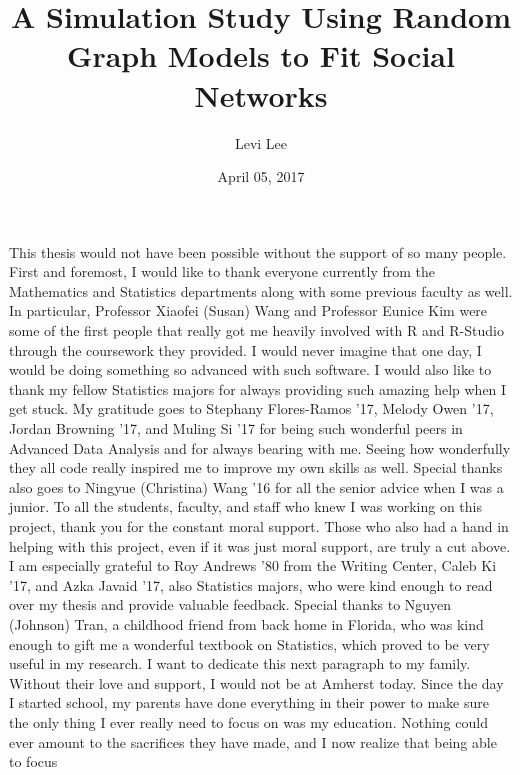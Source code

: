 \documentclass[12pt,twoside]{amherstthesis}
\title{A Simulation Study Using Random Graph Models to Fit Social Networks}
\author{Levi Lee}
\date{April 05, 2017}
\begin{document}
      \maketitle
  
  \frontmatter %
  \pagestyle{empty} %

      \begin{acknowledgements}
      This thesis would not have been possible without the support of so many
      people. First and foremost, I would like to thank everyone currently
      from the Mathematics and Statistics departments along with some previous
      faculty as well. In particular, Professor Xiaofei (Susan) Wang and
      Professor Eunice Kim were some of the first people that really got me
      heavily involved with R and R-Studio through the coursework they
      provided. I would never imagine that one day, I would be doing something
      so advanced with such software. I would also like to thank my fellow
      Statistics majors for always providing such amazing help when I get
      stuck. My gratitude goes to Stephany Flores-Ramos '17, Melody Owen '17,
      Jordan Browning '17, and Muling Si '17 for being such wonderful peers in
      Advanced Data Analysis and for always bearing with me. Seeing how
      wonderfully they all code really inspired me to improve my own skills as
      well. Special thanks also goes to Ningyue (Christina) Wang '16 for all
      the senior advice when I was a junior. To all the students, faculty, and
      staff who knew I was working on this project, thank you for the constant
      moral support. Those who also had a hand in helping with this project,
      even if it was just moral support, are truly a cut above. I am
      especially grateful to Roy Andrews '80 from the Writing Center, Caleb Ki
      '17, and Azka Javaid '17, also Statistics majors, who were kind enough
      to read over my thesis and provide valuable feedback. Special thanks to
      Nguyen (Johnson) Tran, a childhood friend from back home in Florida, who
      was kind enough to gift me a wonderful textbook on Statistics, which
      proved to be very useful in my research. I want to dedicate this next
      paragraph to my family. Without their love and support, I would not be
      at Amherst today. Since the day I started school, my parents have done
      everything in their power to make sure the only thing I ever really need
      to focus on was my education. Nothing could ever amount to the
      sacrifices they have made, and I now realize that being able to focus

\end{acknowledgements}
\end{document}

